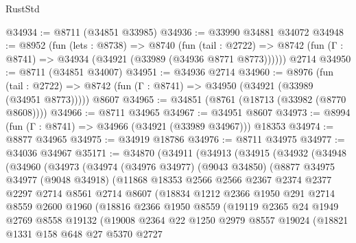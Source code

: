\begin{lexlean}{RustStd}
\begin{coremodule}
@34934 := @8711 (@34851 @33985)
@34936 := @33990 @34881 @34072
@34948 := @8952
    (fun (lets : @8738) =>
    @8740
      (fun (tail : @2722) =>
      @8742 (fun (Γ : @8741) => @34934 (@34921 (@33989 (@34936 @8771 @8773))))))
    @2714
@34950 := @8711 (@34851 @34007)
@34951 := @34936 @2714
@34960 := @8976
    (fun (tail : @2722) => @8742 (fun (Γ : @8741) => @34950 (@34921 (@33989 (@34951 @8773)))))
    @8607
@34965 := @34851 (@8761 (@18713 (@33982 (@8770 @8608))))
@34966 := @8711 @34965
@34967 := @34951 @8607
@34973 := @8994 (fun (Γ : @8741) => @34966 (@34921 (@33989 @34967))) @18353
@34974 := @8877 @34965
@34975 := @34919 @18786
@34976 := @8711 @34975
@34977 := @34036 @34967
@35171 := @34870
    (@34911
      (@34913
        (@34915
          (@34932
            (@34948
              (@34960
                (@34973
                  (@34974
                    (@34976 @34977)
                    (@9043 @34850)
                    (@8877
                      @34975
                      @34977
                      (@9048 @34918)
                      (@11868
                        @18353
                        @2566
                        @2566
                        @2367
                        @2374
                        @2377
                        @2297
                        @2714
                        @8561
                        @2714
                        @8607
                        (@18834
                          @1212
                          @2366
                          @1950
                          @291
                          @2714
                          @8559
                          @2600
                          @1960
                          (@18816
                            @2366
                            @1950
                            @8559
                            (@19119
                              @2365
                              @24
                              @1949
                              @2769
                              @8558
                              @19132
                              (@19008
                                @2364
                                @22
                                @1250
                                @2979
                                @8557
                                @19024
                                (@18821
                                  @1331
                                  @158
                                  @648
                                  @27
                                  @5370
                                  @2727

\end{coremodule}
\end{lexlean}
